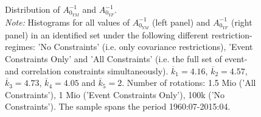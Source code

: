 \documentclass[a4paper,11pt,listof=nochaptergap,oneside,pointednumbers,bibtotoc,bigheadings,liststotoc,hidelinks]{scrbook}
\theoremstyle{mysatz}
\theoremstyle{mydefinition}
\theoremstyle{mytheorem}
\theoremstyle{mybemerkung}
\begin{document}
\begin{figure}[!h]
   \centering
   \setlength\fboxsep{0pt}
   \setlength\fboxrule{0pt}
      \caption[Distribution of $A_{0_{YM}}^{-1}$ and $A_{0_{YF}}^{-1}$.]{Distribution of $A_{0_{YM}}^{-1}$ and $A_{0_{YF}}^{-1}$.\\
      \textit{Note:} Histograms for all values of $A_{0_{YM}}^{-1}$ (left panel) and $A_{0_{YF}}^{-1}$ (right panel) in an identified set under the following different restriction-regimes: 'No Constraints' (i.e. only covariance restrictions), 'Event Constraints Only' and 'All Constraints' (i.e. the full set of event- and correlation constraints simultaneously). $\overline{k}_1 = 4.16$, $\overline{k}_2 = 4.57$, $\overline{k}_3 = 4.73$, $\overline{k}_4 = 4.05$ and $\overline{k}_5 = 2$. Number of rotations: 1.5 Mio ('All Constraints'), 1 Mio ('Event Constraints Only'), 100k ('No Constraints'). The sample spans the period 1960:07-2015:04.}   \label{fig:distribution_impact_matrices_type1}
\end{figure}
\end{document}
